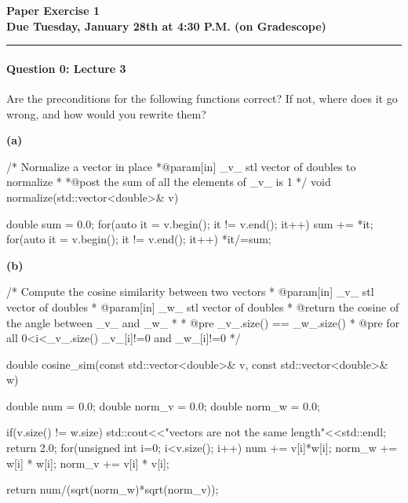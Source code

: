 \documentclass[12pt,letterpaper,twoside]{article}
\begin{document}
{\centering \textbf{Paper Exercise 1 \\ Due
    Tuesday, January 28th at 4:30 P.M. (on Gradescope)} \par}
\vspace*{-8pt}\noindent\rule{\linewidth}{1pt}
\vspace{-3em}


\paragraph{Question 0: Lecture 3}
Are the preconditions for the following functions correct? If not, where does it go wrong, and how would you rewrite them?

\textbf{(a)}
\begin{cpp}
/* Normalize a vector in place
 *@param[in] _v_ stl vector of doubles to normalize
 *
 *@post the sum of all the elements of _v_ is 1
*/
void normalize(std::vector<double>& v){
	double sum = 0.0;
	for(auto it = v.begin(); it != v.end(); it++){
		sum += *it;
	}
	for(auto it = v.begin(); it != v.end(); it++){
		*it/=sum;
	}
	
}	
\end{cpp}

\begin{solution}

\end{solution}

\textbf{(b)}
\begin{cpp}
	/* Compute the cosine similarity between two vectors
	* @param[in] _v_ stl vector of doubles
	* @param[in] _w_ stl vector of doubles
	* @return the cosine of the angle between _v_ and _w_ 
	*
	* @pre _v_.size() == _w_.size()
	* @pre for all 0<i<_v_.size() _v_[i]!=0 and _w_[i]!=0
	*/
	
	double cosine_sim(const std::vector<double>& v, const std::vector<double>& w){
		double num = 0.0;
		double norm_v = 0.0;
		double norm_w = 0.0;
		
		if(v.size() != w.size){
			std::cout<<"vectors are not the same length"<<std::endl;
			return 2.0;
		}
		for(unsigned int i=0; i<v.size(); i++){
			num += v[i]*w[i];
			norm_w += w[i] * w[i];
			norm_v += v[i] * v[i];
		}
		
		return num/(sqrt(norm_w)*sqrt(norm_v));
	}
\end{cpp}

\begin{solution}

\end{solution}
\end{document}
